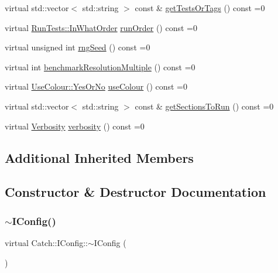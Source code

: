 \begin{DoxyCompactItemize}
\item 
virtual std\+::vector$<$ std\+::string $>$ const  \& \mbox{\hyperlink{struct_catch_1_1_i_config_a1b8a299344a493eb98c12faae48421d7}{get\+Tests\+Or\+Tags}} () const =0
\item 
virtual \mbox{\hyperlink{struct_catch_1_1_run_tests_ab56bd851b1dd085869992d1a9d73dc5d}{Run\+Tests\+::\+In\+What\+Order}} \mbox{\hyperlink{struct_catch_1_1_i_config_a0fc59c9aba1d4018538d5526daa5eb78}{run\+Order}} () const =0
\item 
virtual unsigned int \mbox{\hyperlink{struct_catch_1_1_i_config_ae049eb45979d841073fa65d1094c7f14}{rng\+Seed}} () const =0
\item 
virtual int \mbox{\hyperlink{struct_catch_1_1_i_config_a775f740b8af9df931e87db51dfdc6033}{benchmark\+Resolution\+Multiple}} () const =0
\item 
virtual \mbox{\hyperlink{struct_catch_1_1_use_colour_a6aa78da0c2de7539bb9e3757e204a3f1}{Use\+Colour\+::\+Yes\+Or\+No}} \mbox{\hyperlink{struct_catch_1_1_i_config_a87ec19a6b486eb5b5015cf7738fee026}{use\+Colour}} () const =0
\item 
virtual std\+::vector$<$ std\+::string $>$ const  \& \mbox{\hyperlink{struct_catch_1_1_i_config_afc801995e115557f90e41f3d6e96908d}{get\+Sections\+To\+Run}} () const =0
\item 
virtual \mbox{\hyperlink{namespace_catch_af85c0d46dfe687d923a157362fd07737}{Verbosity}} \mbox{\hyperlink{struct_catch_1_1_i_config_a55aff5924bdbb3f558775821b1eb4b3d}{verbosity}} () const =0
\end{DoxyCompactItemize}
\subsection*{Additional Inherited Members}


\subsection{Constructor \& Destructor Documentation}
\mbox{\label{struct_catch_1_1_i_config_adadf7c57478e4b0c83bea5b38d2dbc87}} 
\subsubsection{\texorpdfstring{$\sim$IConfig()}{~IConfig()}}
{\footnotesize\ttfamily virtual Catch\+::\+I\+Config\+::$\sim$\+I\+Config (\begin{DoxyParamCaption}{ }\end{DoxyParamCaption})\hspace{0.3cm}{\ttfamily [virtual]}}



